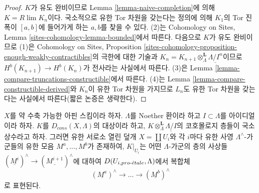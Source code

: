 \begin{proof}
$K$가 유도 완비이므로 Lemma \ref{lemma-naive-completion}에 의해
$K = R\lim K_n$이다. 국소적으로 유한 Tor 차원을 갖는다는 정의에
의해 $K_1$의 Tor 진폭이 $[a, b]$에 들어가게 하는 $a, b$를 찾을 수
있다. (2)는 Cohomology on Sites, Lemma
\ref{sites-cohomology-lemma-bounded}에서 따른다. 다음으로 $K$가 유도
완비이므로 (1)은 Cohomology on Sites, Proposition
\ref{sites-cohomology-proposition-enough-weakly-contractibles}의 극한에
대한 기술과 $K_n = K_{n + 1} \otimes^\mathbf{L}_\Lambda
\underline{\Lambda/I^n}$이므로
$H^b(K_{n + 1}) \to H^b(K_n)$가 전사라는 사실에서 따른다. (3)은
Lemma \ref{lemma-compare-truncations-constructible}에서 따른다. (4)는
Lemma \ref{lemma-compare-constructible-derived}와 $K_n$이 유한 Tor
차원을 가지므로 $L_n$도 유한 Tor 차원을 갖는다는 사실에서
따른다(짧은 논증은 생략한다).
\end{proof}

\begin{lemma}
\label{lemma-local-structure-constructible-complex}
$X$를 약 수축 가능한 아핀 스킴이라 하자. $\Lambda$를 Noether 환이라
하고 $I \subset \Lambda$를 아이디얼이라 하자. $K$를
$D_{cons}(X, \Lambda)$의 대상이라 하고,
$K \otimes_\Lambda^\mathbf{L} \underline{\Lambda/I}$의 코호몰로지
층들이 국소상수라고 하자. 그러면 유한 서로소 열린 덮개
$X = \coprod U_i$와 각 $i$마다 유한 사영
$\Lambda^\wedge$-가군들의 유한 모음 $M^a, \ldots, M^b$가 존재하여,
$K|_{U_i}$는 어떤 $\Lambda$-가군의 층의 사상들
$(\underline{M^i})^\wedge \to (\underline{M^{i + 1}})^\wedge$에 대하여
$D(U_{i, {pro\text{-}\acute{e}tale}}, \Lambda)$에서 복합체
$$
(\underline{M^a})^\wedge \to \ldots \to (\underline{M^b})^\wedge
$$
로 표현된다.
\end{lemma}

